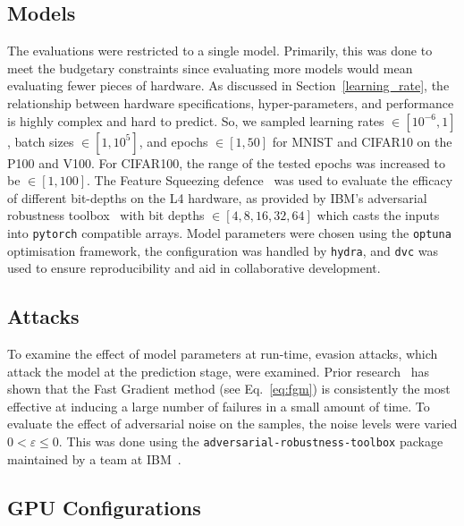 \documentclass[sn-mathphys-num]{sn-jnl}%
\begin{document}
\subsection{Models}

The evaluations were restricted to a single model. Primarily, this was done to meet the budgetary constraints since evaluating more models would mean evaluating fewer pieces of hardware. As discussed in Section~\ref{learning_rate}, the relationship between hardware specifications, hyper-parameters, and performance is highly complex and hard to predict. So, we sampled learning rates $\in [10^{-6}, 1]$, batch sizes $\in [1, 10^5]$, and epochs $\in [1, 50]$ for MNIST and CIFAR10 on the P100 and V100. For CIFAR100, the range of the tested epochs was increased to be $\in [1, 100]$. The Feature Squeezing defence~\cite{feature_squeezing} was used to evaluate the efficacy of different bit-depths on the L4 hardware, as provided by IBM's adversarial robustness toolbox~\cite{art2018} with bit depths $\in [4,8,16,32,64]$ which casts the inputs into \texttt{pytorch} compatible arrays. Model parameters were chosen using the \texttt{optuna} optimisation framework, the configuration was handled by \texttt{hydra}, and \texttt{dvc} was used to ensure reproducibility and aid in collaborative development.


\subsection{Attacks}

To examine the effect of model parameters at run-time, evasion attacks, which attack the model at the prediction stage, were examined.
Prior research~\cite{meyers,meyers_aft} has shown that the Fast Gradient method (see Eq.~\ref{eq:fgm}) is consistently the most effective at inducing a large number of failures in a small amount of time.
To evaluate the effect of adversarial noise on the samples, the noise levels were varied $0 < \varepsilon  \leq 0$.
This was done using the \texttt{adversarial-robustness-toolbox} package maintained by a team at IBM~\cite{art2018}.


\subsection{GPU Configurations}
\end{document}
